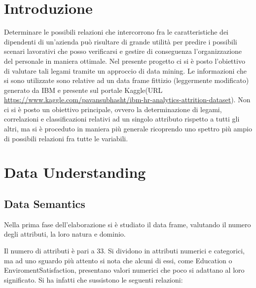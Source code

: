 \documentclass[a4paper,9pt]{article}
\begin{document}
 
\fontoptionnormal 
{}

\preparefrontpagestandard


\justify
\tableofcontents
\newpage


\section{Introduzione}
Determinare le possibili relazioni che intercorrono fra le caratteristiche dei dipendenti di un'azienda può risultare di grande utilità per predire i possibili scenari lavorativi che posso verificarsi e gestire di conseguenza l'organizzazione del personale in maniera ottimale. Nel presente progetto ci si è posto l'obiettivo di valutare tali legami tramite un approccio di data mining. Le informazioni che si sono utilizzate sono relative ad un data frame fittizio (leggermente modificato) generato da IBM e presente sul portale Kaggle(URL \url{https://www.kaggle.com/pavansubhasht/ibm-hr-analytics-attrition-dataset}). Non ci si è posto un obiettivo principale, ovvero la determinazione di legami, correlazioni e classificazioni relativi ad un singolo attributo rispetto a tutti gli altri, ma si è proceduto in maniera più generale ricoprendo uno spettro più ampio di possibili relazioni fra tutte le variabili.
\section{Data Understanding}
\subsection{Data Semantics}
Nella prima fase dell'elaborazione si è studiato il data frame, valutando il numero degli attributi, la loro natura e dominio. 


Il numero di attributi è pari a 33. Si dividono in attributi numerici e categorici, ma ad uno sguardo più attento si nota che alcuni di essi, come Education o EnviromentSatisfaction, presentano valori numerici che poco si adattano al loro significato. Si ha infatti che sussistono le seguenti relazioni: 
\end{document}
